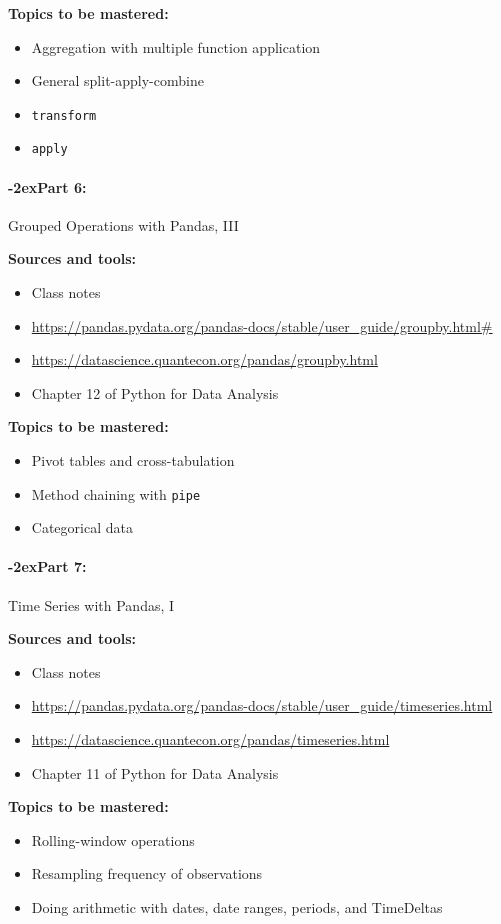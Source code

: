 \documentclass[11pt]{article}
\newcommand{\module}[1]{%
    \paragraph*{\kern-2ex\quad #1:}
  }
\begin{document}
  {\bf Topics to be mastered:}
  \begin{itemize}
    \item Aggregation with multiple function application
    \item General split-apply-combine
    \item \texttt{transform}
    \item \texttt{apply}
  \end{itemize}

  \module{Part 6} Grouped Operations with Pandas, III

  \bigskip

  {\bf Sources and tools:}
  \begin{itemize}
    \item Class notes
    \item \url{https://pandas.pydata.org/pandas-docs/stable/user_guide/groupby.html#}
    \item \url{https://datascience.quantecon.org/pandas/groupby.html}
    \item Chapter 12 of Python for Data Analysis
  \end{itemize}

  {\bf Topics to be mastered:}
  \begin{itemize}
    \item Pivot tables and cross-tabulation
    \item Method chaining with \texttt{pipe}
    \item Categorical data
  \end{itemize}

  \module{Part 7} Time Series with Pandas, I

  \bigskip

  {\bf Sources and tools:}
  \begin{itemize}
    \item Class notes
    \item \url{https://pandas.pydata.org/pandas-docs/stable/user_guide/timeseries.html}
    \item \url{https://datascience.quantecon.org/pandas/timeseries.html}
    \item Chapter 11 of Python for Data Analysis
  \end{itemize}

  {\bf Topics to be mastered:}
  \begin{itemize}
    \item Rolling-window operations
    \item Resampling frequency of observations
    \item Doing arithmetic with dates, date ranges, periods, and TimeDeltas
  \end{itemize}
\end{document}
